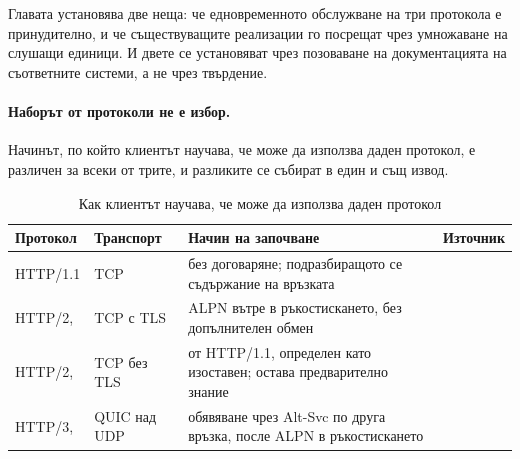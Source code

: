 %
%

\section*{}

\subsection*{}

Главата установява две неща: че едновременното обслужване на три протокола е принудително, и
че съществуващите реализации го посрещат чрез умножаване на слушащи единици. И двете се
установяват чрез позоваване на документацията на съответните системи, а не чрез твърдение.

\paragraph{Наборът от протоколи не е избор.} Начинът, по който клиентът научава, че може да
използва даден протокол, е различен за всеки от трите, и разликите се събират в един и същ
извод.

\begin{table}[H]
\centering
\caption{Как клиентът научава, че може да използва даден протокол}
\label{tab:av-negotiation}
\begin{tabular}{@{}L{2.2cm}L{2.1cm}L{7.2cm}L{2.2cm}@{}}
\toprule
\textbf{Протокол} & \textbf{Транспорт} & \textbf{Начин на започване} & \textbf{Източник} \\
\midrule
HTTP/1.1 & TCP & без договаряне; подразбиращото се съдържание на връзката &
\cite{rfc9112} \\
HTTP/2,  & TCP с TLS & ALPN вътре в ръкостискането, без допълнителен обмен &
\cite{rfc7301, rfc7540} \\
HTTP/2,  & TCP без TLS &  от HTTP/1.1, определен като изоставен;
остава предварително знание & \cite{rfc7540, rfc9113} \\
HTTP/3,  & QUIC над UDP & обявяване чрез Alt-Svc по друга връзка, после ALPN в
ръкостискането & \cite{rfc7838, rfc9114} \\
\bottomrule
\end{tabular}
\end{table}

